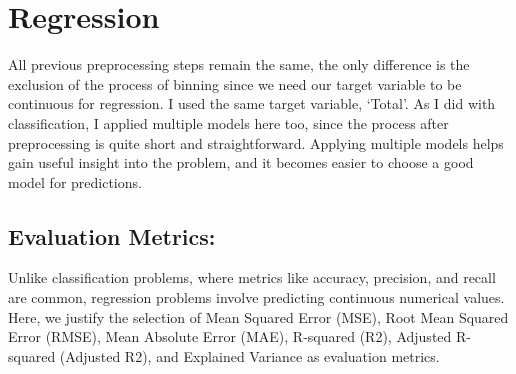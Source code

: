 
\chapter{Regression} %

\label{Chapter10} %

All previous preprocessing steps remain the same, the only difference is the exclusion of the process of binning since we need our target variable to be continuous for regression. I used the same target variable, ‘Total’. As I did with classification, I applied multiple models here too, since the process after preprocessing is quite short and straightforward. Applying multiple models helps gain useful insight into the problem, and it becomes easier to choose a good model for predictions.



\section{Evaluation Metrics:}

Unlike classification problems, where metrics like accuracy, precision, and recall are common, regression problems involve predicting continuous numerical values. Here, we justify the selection of Mean Squared Error (MSE), Root Mean Squared Error (RMSE), Mean Absolute Error (MAE), R-squared (R2), Adjusted R-squared (Adjusted R2), and Explained Variance as evaluation metrics.

